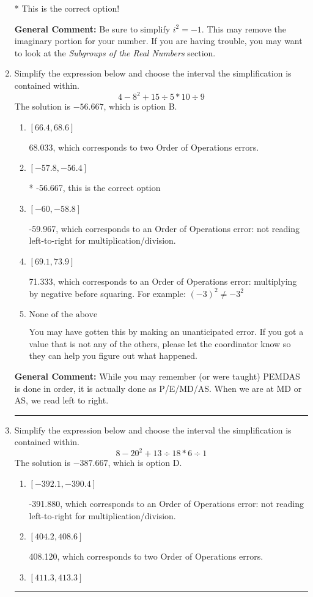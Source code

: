 \documentclass{extbook}[14pt]
\newcommand{\litem}[1]{\item #1

\rule{\textwidth}{0.4pt}}
\begin{document}
\begin{enumerate}
{\begin{enumerate}[label=\Alph*.]
* This is the correct option!
\end{enumerate}

\textbf{General Comment:} Be sure to simplify $i^2 = -1$. This may remove the imaginary portion for your number. If you are having trouble, you may want to look at the \textit{Subgroups of the Real Numbers} section.
}
\litem{
Simplify the expression below and choose the interval the simplification is contained within.
\[ 4 - 8^2 + 15 \div 5 * 10 \div 9 \]The solution is \( -56.667 \), which is option B.\begin{enumerate}[label=\Alph*.]
\item \( [66.4, 68.6] \)

 68.033, which corresponds to two Order of Operations errors.
\item \( [-57.8, -56.4] \)

* -56.667, this is the correct option
\item \( [-60, -58.8] \)

 -59.967, which corresponds to an Order of Operations error: not reading left-to-right for multiplication/division.
\item \( [69.1, 73.9] \)

 71.333, which corresponds to an Order of Operations error: multiplying by negative before squaring. For example: $(-3)^2 \neq -3^2$
\item \( \text{None of the above} \)

 You may have gotten this by making an unanticipated error. If you got a value that is not any of the others, please let the coordinator know so they can help you figure out what happened.
\end{enumerate}

\textbf{General Comment:} While you may remember (or were taught) PEMDAS is done in order, it is actually done as P/E/MD/AS. When we are at MD or AS, we read left to right.
}
\litem{
Simplify the expression below and choose the interval the simplification is contained within.
\[ 8 - 20^2 + 13 \div 18 * 6 \div 1 \]The solution is \( -387.667 \), which is option D.\begin{enumerate}[label=\Alph*.]
\item \( [-392.1, -390.4] \)

 -391.880, which corresponds to an Order of Operations error: not reading left-to-right for multiplication/division.
\item \( [404.2, 408.6] \)

 408.120, which corresponds to two Order of Operations errors.
\item \( [411.3, 413.3] \)


\end{enumerate}}
\end{enumerate}
\end{document}
